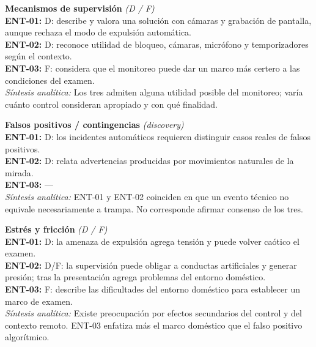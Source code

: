\begin{center}
\begin{infobox}
\textbf{\textcolor{accent}{Mecanismos de supervisión}} \textit{(D / F)}\\
\textbf{ENT-01:} D: describe y valora una solución con cámaras y grabación de pantalla, aunque rechaza el modo de expulsión automática.\\
\textbf{ENT-02:} D: reconoce utilidad de bloqueo, cámaras, micrófono y temporizadores según el contexto.\\
\textbf{ENT-03:} F: considera que el monitoreo puede dar un marco más certero a las condiciones del examen.\\
\textit{Síntesis analítica:} Los tres admiten alguna utilidad posible del monitoreo; varía cuánto control consideran apropiado y con qué finalidad.
\end{infobox}
\vspace{2pt}
\begin{infobox}
\textbf{\textcolor{accent}{Falsos positivos / contingencias}} \textit{(discovery)}\\
\textbf{ENT-01:} D: los incidentes automáticos requieren distinguir casos reales de falsos positivos.\\
\textbf{ENT-02:} D: relata advertencias producidas por movimientos naturales de la mirada.\\
\textbf{ENT-03:} ---\\
\textit{Síntesis analítica:} ENT-01 y ENT-02 coinciden en que un evento técnico no equivale necesariamente a trampa. No corresponde afirmar consenso de los tres.
\end{infobox}
\vspace{2pt}
\begin{infobox}
\textbf{\textcolor{accent}{Estrés y fricción}} \textit{(D / F)}\\
\textbf{ENT-01:} D: la amenaza de expulsión agrega tensión y puede volver caótico el examen.\\
\textbf{ENT-02:} D/F: la supervisión puede obligar a conductas artificiales y generar presión; tras la presentación agrega problemas del entorno doméstico.\\
\textbf{ENT-03:} F: describe las dificultades del entorno doméstico para establecer un marco de examen.\\
\textit{Síntesis analítica:} Existe preocupación por efectos secundarios del control y del contexto remoto. ENT-03 enfatiza más el marco doméstico que el falso positivo algorítmico.
\end{infobox}
\vspace{2pt}
\begin{infobox}

\end{infobox}
\end{center}
